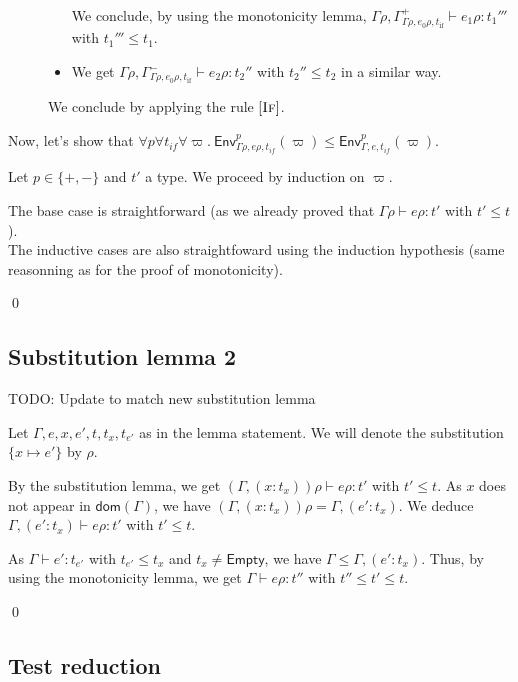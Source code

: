 \documentclass[a4paper]{article}%
\newcommand{\dom}[1]{\textsf{dom}(#1)}
\newcommand{\Empty} {\textsf{Empty}}%
\newcommand{\subst}[2]{\{#1 \mapsto #2\}}
\newcommand{\Gp}[2]{\textsf{Env}^{#1}_{#2}}
\theoremstyle{definition}
\newcommand {\Rule}[1] {[\textsc{#1}]}
\begin{document}
\begin{description}
\begin{itemize}
            We conclude, by using the monotonicity lemma, $\Gamma\rho, \Gamma^+_{\Gamma\rho,e_0\rho,t_{\text{if}}} \vdash e_1\rho:t_1'''$ with $t_1''' \leq t_1$.
            \item We get $\Gamma\rho, \Gamma^-_{\Gamma\rho,e_0\rho,t_{\text{if}}}\vdash e_2\rho:t_2''$ with $t_2'' \leq t_2$ in a similar way.
          \end{itemize}
          We conclude by applying the rule $\Rule {If}$.
        \end{description}
    
        Now, let's show that $\forall p \forall t_{if} \forall \varpi.\ \Gp p {\Gamma\rho,e\rho,t_{if}} (\varpi) \leq \Gp p {\Gamma,e,t_{if}} (\varpi)$.
    
        Let $p\in \{+,-\}$ and $t'$ a type.
        We proceed by induction on $\varpi$.
    
        The base case is straightforward (as we already proved that $\Gamma \rho \vdash e \rho:t'$ with $t'\leq t$).\\
        The inductive cases are also straightfoward using the induction hypothesis (same reasonning as for the proof of monotonicity).
    
        \qed
    
        \subsection{Substitution lemma 2}

        TODO: Update to match new substitution lemma
    
        Let $\Gamma,e,x,e',t,t_x,t_{e'}$ as in the lemma statement.
        We will denote the substitution $\subst x {e'}$ by $\rho$.
    
        By the substitution lemma, we get $(\Gamma, (x:t_x))\rho \vdash e\rho:t'$ with $t' \leq t$.
        As $x$ does not appear in $\dom \Gamma$, we have $(\Gamma, (x:t_x))\rho = \Gamma, (e':t_x)$.
        We deduce $\Gamma, (e':t_x) \vdash e\rho:t'$ with $t' \leq t$.
    
        As $\Gamma \vdash e':t_{e'}$ with $t_{e'} \leq t_x$ and $t_x \neq \Empty$, we have $\Gamma \leq \Gamma, (e':t_x)$.
        Thus, by using the monotonicity lemma, we get $\Gamma\vdash e\rho:t''$ with $t'' \leq t' \leq t$.
    
        \qed
    
        \subsection{Test reduction}
    
\end{document}
